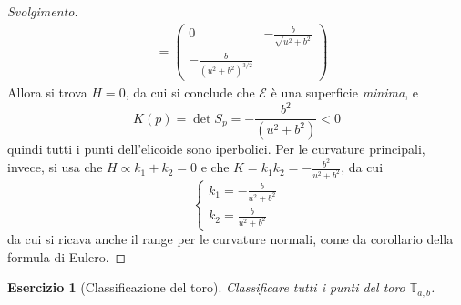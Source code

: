 \documentclass[12pt]{scrartcl}
\theoremstyle{style}
\newtheorem{esercizio}{Esercizio}[section]
\newenvironment{svolgimento}{\renewcommand\qedsymbol{$\blacksquare$}\begin{proof}[Svolgimento]}{\end{proof}}
\numberwithin{equation}{subsection}
\begin{document}
\begin{svolgimento}
\[\begin{split}
				  &= \begin{pmatrix} 0 & -\frac{b}{\sqrt{u^2 + b^2} } \\ -\frac{b}{(u^2 + b^2 )^{3 / 2} } \end{pmatrix} 
	\end{split}
\] 
Allora si trova $H = 0$, da cui si conclude che $\mathcal{E} $ \`e una superficie \textit{minima}, e 
\[
K(p) = \det S_p =- \frac{b^2}{(u^2 + b^2 )}< 0
\] 
quindi tutti i punti dell'elicoide sono iperbolici.
Per le curvature principali, invece, si usa che $H \propto k_1 + k_2 = 0 $ e che $K = k_1k_2 =- \frac{b^2 }{u^2 + b^2}$, da cui
\[
\begin{cases}
	k_1 = \displaystyle -\frac{b}{u^2 + b^2}\\
	k_2 = \displaystyle  \frac{b}{u^2 + b^2}
\end{cases}
\] 
da cui si ricava anche il range per le curvature normali, come da corollario della formula di Eulero.
\end{svolgimento}
\begin{esercizio}
	[Classificazione del toro]
	Classificare tutti i punti del toro $\mathbb{T}_{a,b}$.
\end{esercizio}
\end{document}
